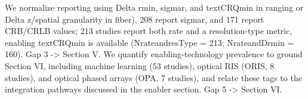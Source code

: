 We normalize reporting using \markdownRendererDollarSign{}\markdownRendererBackslash{}Delta r\markdownRendererUnderscore{}\markdownRendererLeftBrace{}\markdownRendererBackslash{}min\markdownRendererRightBrace{}\markdownRendererDollarSign{}, \markdownRendererDollarSign{}\markdownRendererBackslash{}sigma\markdownRendererUnderscore{}r\markdownRendererDollarSign{}, and \markdownRendererDollarSign{}\markdownRendererBackslash{}text\markdownRendererLeftBrace{}CRQ\markdownRendererRightBrace{}\markdownRendererLeftBrace{}\markdownRendererBackslash{}min\markdownRendererRightBrace{}\markdownRendererDollarSign{} in ranging or \markdownRendererDollarSign{}\markdownRendererBackslash{}Delta z\markdownRendererDollarSign{}/spatial granularity in fiber), 208 report \markdownRendererDollarSign{}\markdownRendererBackslash{}sigma\markdownRendererUnderscore{}r\markdownRendererDollarSign{}, and 171 report CRB/CRLB values; 213 studies report both rate and a resolution-type metric, enabling \markdownRendererDollarSign{}\markdownRendererBackslash{}text\markdownRendererLeftBrace{}CRQ\markdownRendererRightBrace{}\markdownRendererLeftBrace{}\markdownRendererBackslash{}min\markdownRendererRightBrace{}\markdownRendererDollarSign{} is available (N\markdownRendererUnderscore{}rate\markdownRendererUnderscore{}and\markdownRendererUnderscore{}resType = 213; N\markdownRendererUnderscore{}rate\markdownRendererUnderscore{}and\markdownRendererUnderscore{}Drmin = 160).  Gap 3 -> Section V.\markdownRendererOlItemEnd 
{} We quantify enabling-technology prevalence to ground Section VI, including machine learning (53 studies), optical RIS (ORIS, 8 studies), and optical phased arrays (OPA, 7 studies), and relate these tags to the integration pathways discussed in the enabler section.  Gap 5 -> Section VI.\markdownRendererOlItemEnd 
